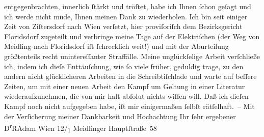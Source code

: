 \begin{ledgroupsized}[t]{13cm}
               entgegenbrachten, innerlich ſtärkt und tröſtet, habe ich Ihnen ſchon geſagt und ich
               werde nicht müde, Ihnen meinen Dank zu wiederholen.\pend
           \pstart
           Ich bin seit einiger Zeit von Ziſtersdorf nach
                  Wien verſetzt, hier proviſoriſch dem Bezirksgericht Floridsdorf zugeteilt und verbringe
               meine Tage auf der Elektriſchen (der Weg von Meidling nach Floridsdorf iſt ſchrecklich
               weit!) und mit der Aburteilung größtenteils recht unintereſſanter Straffälle.\pend
           \pstart
           Meine unglückſelige Arbeit verſchließe ich, indem ich dieſe Enttäuſchung, wie ſo
               viele früher, geduldig trage, zu den andern nicht glücklicheren Arbeiten in die
               Schreibtiſchlade und warte auf beſſere Zeiten, um mit einer neuen Arbeit den Kampf um
               Geltung in einer Literatur wiederaufzunehmen, die von mir halt abſolut nichts wiſſen
               will. Daß ich die{\pb}ſen Kampf noch nicht aufgegeben
               habe, iſt mir einigermaßen ſelbſt rätſelhaft. –\pend
           \pstart
           Mit der Verſicherung meiner Dankbarkeit und Hochachtung Ihr ſehr ergebener\pend
           \pstart \spacefill\mbox{D\textsuperscript{r}RAdam}\pend{}\pstart
           \noindent{}Wien 12/\textsubscript{1} Meidlinger
                     Hauptſtraße 58\pend
           
         
         \endnumbering{}\end{ledgroupsized}  \newcommand{\dateiname}{L02219}\newcommand{\titel}{Robert Adam an Arthur Schnitzler, 26. 9. 1915}\newcommand{\editorInnen}{Martin Anton Müller und Gerd-Hermann Susen}
      